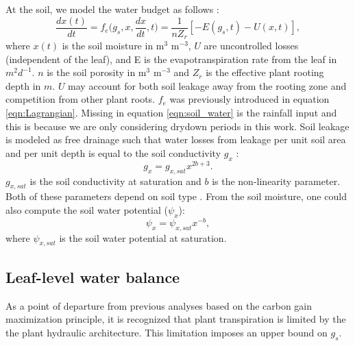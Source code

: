 \documentclass[utf8]{frontiersSCNS} %
\begin{document}
At the soil, we model the water budget as follows \citep{Rodriguez-Iturbe2007}:
\begin{equation}
    \label{eqn:soil_water}
    \frac{dx(t)}{dt} = f_e\Big(g_s, x, \frac{dx}{dt}, t\Big) = \frac{1}{n Z_r}[- E(g_s, t) - U(x, t)],
\end{equation}
where $x(t)$ is the soil moisture in m$^3$ m$^{-3}$, $U$ are uncontrolled losses (independent of the leaf), and E is the evapotranspiration rate from the leaf in $m^2d^{-1}$. $n$ is the soil porosity in m$^3$ m$^{-3}$ and $Z_r$ is the effective plant rooting depth in $m$. $U$ may account for both soil leakage away from the rooting zone and competition from other plant roots. $f_e$ was previously introduced in equation \ref{eqn:Lagrangian}. Missing in equation \ref{eqn:soil_water} is the rainfall input and this is because we are only considering drydown periods in this work. Soil leakage is modeled as free drainage such that water losses from leakage per unit soil area and per unit depth is equal to the soil conductivity $g_x$ \citep{campbell1974}:
\begin{equation}
    \label{eqn:soil_cond}
    g_x = g_{x,sat}x^{2b+3}.
\end{equation}
$g_{x,sat}$ is the soil conductivity at saturation and $b$ is the non-linearity parameter. Both of these parameters depend on soil type \citep{Clapp1978}. From the soil moisture, one could also compute the soil water potential ($\psi_x$):
\begin{equation}
    \label{eqn:Clapp_pot}
    \psi_x = \psi_{x,sat}x^{-b},
\end{equation}
where $\psi_{x,sat}$ is the soil water potential at saturation.

\subsection{Leaf-level water balance}

As a point of departure from previous analyses based on the carbon gain maximization principle, it is recognized that plant transpiration is limited by the the plant hydraulic architecture. This limitation imposes an upper bound on $g_s$. 

\end{document}
